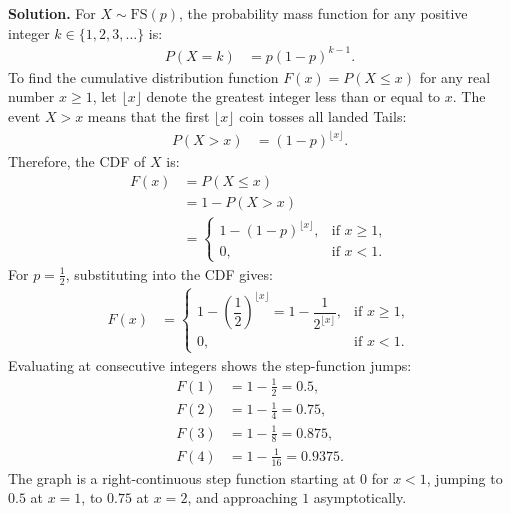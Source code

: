 \documentclass[11pt,a4paper]{article}
\begin{document}
\noindent \textbf{Solution.} For $X \sim \text{FS}(p)$, the probability mass function for any positive integer $k \in \{1, 2, 3, \dots\}$ is:
\begin{align*}
P(X = k) &= p(1 - p)^{k-1}.
\end{align*}
To find the cumulative distribution function $F(x) = P(X \le x)$ for any real number $x \ge 1$, let $\lfloor x \rfloor$ denote the greatest integer less than or equal to $x$. The event $X > x$ means that the first $\lfloor x \rfloor$ coin tosses all landed Tails:
\begin{align*}
P(X > x) &= (1 - p)^{\lfloor x \rfloor}.
\end{align*}
Therefore, the CDF of $X$ is:
\begin{align*}
F(x) &= P(X \le x) \\
&= 1 - P(X > x) \\
&= \begin{cases}
1 - (1 - p)^{\lfloor x \rfloor}, & \text{if } x \ge 1, \\[4pt]
0, & \text{if } x < 1.
\end{cases}
\end{align*}
For $p = \frac{1}{2}$, substituting into the CDF gives:
\begin{align*}
F(x) &= \begin{cases}
1 - \left(\dfrac{1}{2}\right)^{\lfloor x \rfloor} = 1 - \dfrac{1}{2^{\lfloor x \rfloor}}, & \text{if } x \ge 1, \\[10pt]
0, & \text{if } x < 1.
\end{cases}
\end{align*}
Evaluating at consecutive integers shows the step-function jumps:
\begin{align*}
F(1) &= 1 - \frac{1}{2} = 0.5, \\
F(2) &= 1 - \frac{1}{4} = 0.75, \\
F(3) &= 1 - \frac{1}{8} = 0.875, \\
F(4) &= 1 - \frac{1}{16} = 0.9375.
\end{align*}
The graph is a right-continuous step function starting at $0$ for $x < 1$, jumping to $0.5$ at $x = 1$, to $0.75$ at $x = 2$, and approaching $1$ asymptotically.

\vspace{10pt}
\end{document}
